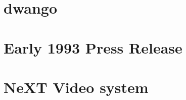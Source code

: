 \documentclass{book}
\begin{document}
      \chapter{dwango}
      
      \chapter{Early 1993 Press Release}
      
      \chapter{NeXT Video system}
      
    \cleartoleftpage %
    
    \blankpage
    \blankpage
\end{document}
